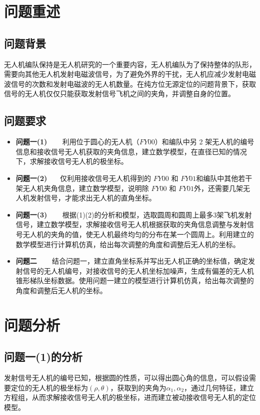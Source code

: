 \documentclass[withoutpreface,bwprint]{cumcmthesis} %
\begin{document}
	
	\section{问题重述}
		\subsection{问题背景}
        无人机编队保持是无人机研究的一个重要内容，无人机编队为了保持整体的队形，需要向其他无人机发射电磁波信号，为了避免外界的干扰，无人机应减少发射电磁波信号的次数和发射电磁波的无人机数量。在纯方位无源定位的问题背景下，获取信号的无人机仅仅只能获取发射信号飞机之间的夹角，并调整自身的位置。
		\subsection{问题要求}
		\begin{itemize}
	\item \textbf{问题一(1)} ~~~ 利用位于圆心的无人机（$FY00$）和编队中另 2 架无人机的编号信息和接收信号无人机获取的夹角信息，建立数学模型，在直径已知的情况下，求解接收信号无人机的极坐标。
	
	\item \textbf{问题一(2)}  ~~~仅利用接收信号无人机得到的 $FY00$ 和 $FY01$和编队中其他若干架无人机夹角信息，建立数学模型，说明除 $FY00$ 和 $FY01$外，还需要几架无人机发射信号，才能求出无人机的直角坐标。
	
	\item \textbf{问题一(3)} ~~~ 根据(1)(2)的分析和模型，选取圆周和圆周上最多3架飞机发射信号，建立数学模型，求解接收信号无人机根据获取的夹角信息调整与发射信号无人机的夹角的值，使无人机最终均匀的分布在某一个圆周上。利用建立的数学模型进行计算机仿真，给出每次调整的角度和调整后无人机的坐标。
	
	\item \textbf{问题二}  ~~~ 结合问题一，建立直角坐标系并写出无人机正确的坐标值，确定发射信号的无人机编号，对接收信号的无人机坐标加噪声，生成有偏差的无人机锥形梯队坐标数据。使用问题一建立的模型进行计算机仿真，给出每次调整的角度和调整后无人机的坐标。
	
	
	
\end{itemize}
	
	
	\section{问题分析}
		\subsection{问题一(1)的分析}
		发射信号无人机的编号已知，根据圆的性质，可以得出圆心角的信息，可以假设需要定位的无人机的极坐标为\textbf{$(\rho,\theta)$}，获取到的夹角为\textbf{$\alpha_1,\alpha_2$}，通过几何特征，建立方程组，从而求解接收信号无人机的极坐标，进而建立被动接收信号无人机的定位模型。
	
\end{document}
